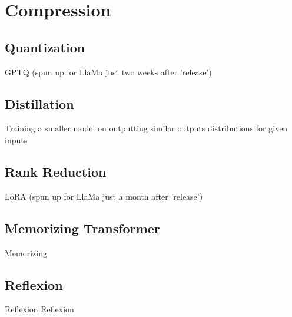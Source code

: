 \section{Compression}
\subsection{Quantization}
\begin{frame}[c]
    GPTQ \cite{frantar_gptq_2022}
    (spun up for LlaMa just two weeks after 'release')
\end{frame}

\subsection{Distillation}
\begin{frame}[c]
    Training a smaller model on outputting similar outputs distributions for given inputs
    \cite{sun_patient_2019}
    \cite{polino_model_2018}
\end{frame}

\subsection{Rank Reduction}
\begin{frame}[c]
    LoRA \cite{hu_lora_2021}
    (spun up for LlaMa just a month after 'release')
\end{frame}

\subsection{Memorizing Transformer}
\begin{frame}[c]
    Memorizing \cite{wu_memorizing_2022}
\end{frame}

\subsection{Reflexion}
\begin{frame}[c]{Reflexion}
    Reflexion \cite{rombach_highresolution_2022}
\end{frame}
